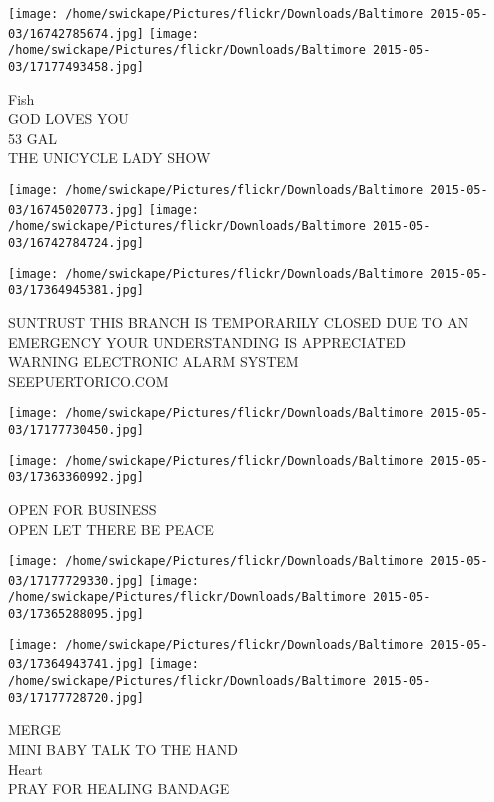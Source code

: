 \documentclass[10pt,letterpaper]{article}
\begin{document}
\texttt{[image: /home/swickape/Pictures/flickr/Downloads/Baltimore 2015-05-03/16742785674.jpg]}
\texttt{[image: /home/swickape/Pictures/flickr/Downloads/Baltimore 2015-05-03/17177493458.jpg]}

Fish\\
GOD LOVES YOU\\
53 GAL\\
THE UNICYCLE LADY SHOW\\
\pagebreak

\texttt{[image: /home/swickape/Pictures/flickr/Downloads/Baltimore 2015-05-03/16745020773.jpg]}
\texttt{[image: /home/swickape/Pictures/flickr/Downloads/Baltimore 2015-05-03/16742784724.jpg]}

\texttt{[image: /home/swickape/Pictures/flickr/Downloads/Baltimore 2015-05-03/17364945381.jpg]}

SUNTRUST THIS BRANCH IS TEMPORARILY CLOSED DUE TO AN EMERGENCY YOUR UNDERSTANDING IS APPRECIATED\\
WARNING ELECTRONIC ALARM SYSTEM\\
SEEPUERTORICO.COM\\
\pagebreak

\texttt{[image: /home/swickape/Pictures/flickr/Downloads/Baltimore 2015-05-03/17177730450.jpg]}

\vspace{0.25in}
\texttt{[image: /home/swickape/Pictures/flickr/Downloads/Baltimore 2015-05-03/17363360992.jpg]}

OPEN FOR BUSINESS\\
OPEN LET THERE BE PEACE\\
\pagebreak

\texttt{[image: /home/swickape/Pictures/flickr/Downloads/Baltimore 2015-05-03/17177729330.jpg]}
\texttt{[image: /home/swickape/Pictures/flickr/Downloads/Baltimore 2015-05-03/17365288095.jpg]}

\texttt{[image: /home/swickape/Pictures/flickr/Downloads/Baltimore 2015-05-03/17364943741.jpg]}
\texttt{[image: /home/swickape/Pictures/flickr/Downloads/Baltimore 2015-05-03/17177728720.jpg]}

MERGE\\
MINI BABY TALK TO THE HAND\\
Heart\\
PRAY FOR HEALING BANDAGE\\
\pagebreak
\end{document}
